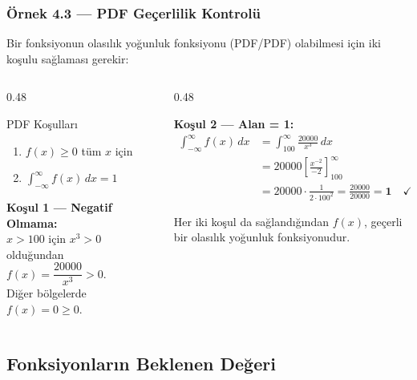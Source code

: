 ﻿\documentclass[light]{lutbeamer}
\begin{document}
\begin{frame}[fragile]
  \frametitle[Örnek 4.3 PDF]{Örnek 4.3 --- PDF Geçerlilik Kontrolü}
  {\small Bir fonksiyonun olasılık yoğunluk fonksiyonu (PDF/PDF) olabilmesi için iki koşulu sağlaması gerekir:}

  \begin{columns}[t,onlytextwidth]
    \begin{column}{0.48\textwidth}
      \begin{block}{PDF Koşulları}
        {\footnotesize
        \begin{enumerate}
          \item $f(x) \geq 0$ \quad tüm $x$ için
          \item $\displaystyle\int_{-\infty}^{\infty} f(x)\,dx = 1$
        \end{enumerate}
        }
      \end{block}

      {\footnotesize
      \textbf{Koşul 1 --- Negatif Olmama:}\\
      $x > 100$ için $x^3 > 0$ olduğundan
      $f(x) = \dfrac{20000}{x^3} > 0$.\\
      Diğer bölgelerde $f(x)=0 \geq 0$. \checkmark
      }
    \end{column}

    \begin{column}{0.48\textwidth}
      {\footnotesize
      \textbf{Koşul 2 --- Alan = 1:}
      \begin{align*}
        \int_{-\infty}^{\infty} f(x)\,dx
          &= \int_{100}^{\infty} \frac{20000}{x^3}\,dx \\
          &= 20000 \left[\frac{x^{-2}}{-2}\right]_{100}^{\infty} \\
          &= 20000 \cdot \frac{1}{2 \cdot 100^{2}}
           = \frac{20000}{20000}
           = \mathbf{1} \quad \checkmark
      \end{align*}

      Her iki koşul da sağlandığından $f(x)$, geçerli bir olasılık yoğunluk fonksiyonudur.
      }
    \end{column}
  \end{columns}
\end{frame}

\subsection{Fonksiyonların Beklenen Değeri}
\end{document}
